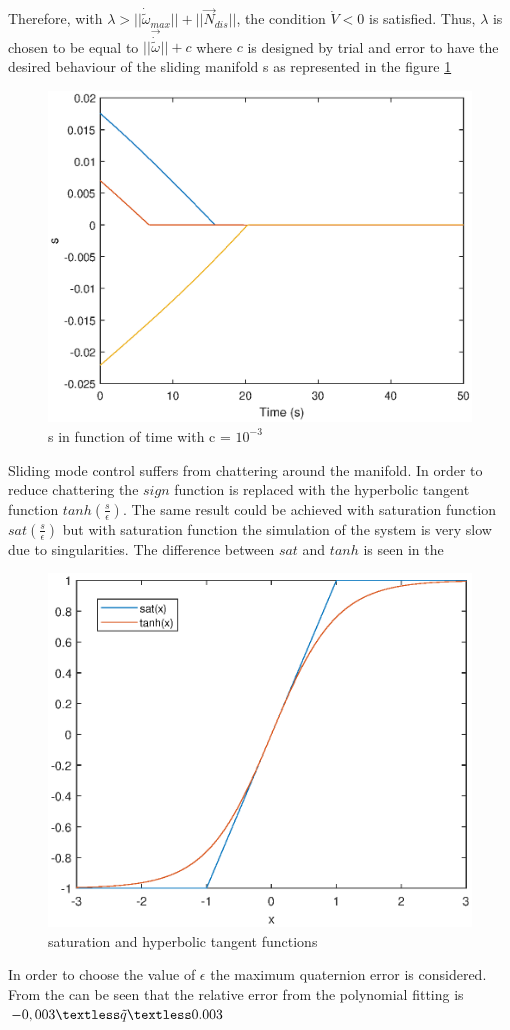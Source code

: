Therefore, with $\lambda > ||\dot{\tilde{\omega}}_{max}|| + ||\vec{N}_{dis}|| $, the condition $\dot {V} <0 $ is satisfied. Thus, $\lambda$ is chosen to be equal to $||\vec{\dot{\tilde{\omega}}}|| + c$ where $c$ is designed by trial and error to have the desired behaviour of the sliding manifold s as represented in the figure \ref{fig:s}
\begin{figure}[H]
	\centering
	\includegraphics[width=0.7\linewidth]{figures/s}
	\caption{s in function of time with c = $10^{-3}$}
	\label{fig:s}
\end{figure}  
%
Sliding mode control suffers from chattering around the manifold. In order to reduce chattering the $sign$ function is replaced with the hyperbolic tangent function $tanh(\frac{s}{\epsilon})$. The same result could be achieved with saturation function $sat(\frac{s}{\epsilon})$ but with saturation function the simulation of the system is very slow due to singularities. The difference between $sat$ and $tanh$ is seen in the  
%
\begin{figure}[H]
	\centering
	\includegraphics[width=0.7\linewidth]{figures/sat_tanh.eps}
	\caption{ saturation and hyperbolic tangent functions}
	\label{fig:sat_tanh.eps}
\end{figure} 
%
In order to choose the value of $\epsilon$ the maximum quaternion error is considered. From the  can be seen that the relative error from the polynomial fitting is $- 0,003\textless\tilde{q}\textless0.003$ 